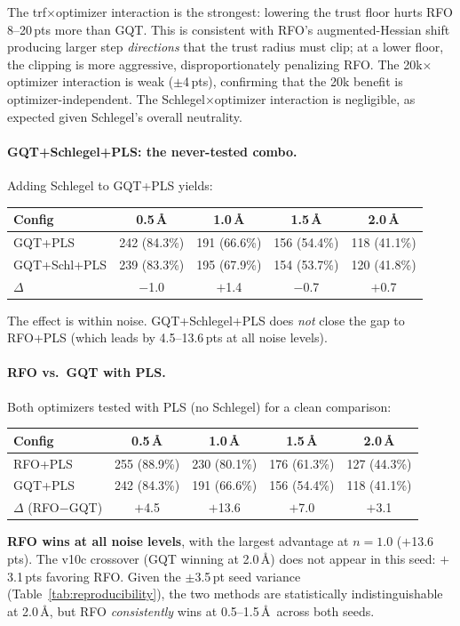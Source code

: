 \documentclass[11pt,a4paper]{article}
\theoremstyle{definition}
\begin{document}
The trf$\times$optimizer interaction is the strongest: lowering the trust
floor hurts RFO 8--20\,pts more than GQT.  This is consistent with RFO's
augmented-Hessian shift producing larger step \emph{directions} that the
trust radius must clip; at a lower floor, the clipping is more aggressive,
disproportionately penalizing RFO.  The 20k$\times$optimizer interaction
is weak ($\pm$4\,pts), confirming that the 20k benefit is optimizer-independent.
The Schlegel$\times$optimizer interaction is negligible, as expected given
Schlegel's overall neutrality.

\paragraph{GQT+Schlegel+PLS: the never-tested combo.}
Adding Schlegel to GQT+PLS yields:
\begin{center}
\begin{tabular}{lcccc}
\toprule
Config & 0.5\,\AA & 1.0\,\AA & 1.5\,\AA & 2.0\,\AA \\
\midrule
GQT+PLS       & 242 (84.3\%) & 191 (66.6\%) & 156 (54.4\%) & 118 (41.1\%) \\
GQT+Schl+PLS  & 239 (83.3\%) & 195 (67.9\%) & 154 (53.7\%) & 120 (41.8\%) \\
$\Delta$       & $-$1.0       & $+$1.4       & $-$0.7       & $+$0.7       \\
\bottomrule
\end{tabular}
\end{center}
The effect is within noise.  GQT+Schlegel+PLS does \emph{not} close the gap
to RFO+PLS (which leads by 4.5--13.6\,pts at all noise levels).

\paragraph{RFO vs.\ GQT with PLS.}
Both optimizers tested with PLS (no Schlegel) for a clean comparison:
\begin{center}
\begin{tabular}{lcccc}
\toprule
Config & 0.5\,\AA & 1.0\,\AA & 1.5\,\AA & 2.0\,\AA \\
\midrule
RFO+PLS  & 255 (88.9\%) & 230 (80.1\%) & 176 (61.3\%) & 127 (44.3\%) \\
GQT+PLS  & 242 (84.3\%) & 191 (66.6\%) & 156 (54.4\%) & 118 (41.1\%) \\
$\Delta$ (RFO$-$GQT) & $+$4.5 & $+$13.6 & $+$7.0 & $+$3.1 \\
\bottomrule
\end{tabular}
\end{center}
\textbf{RFO wins at all noise levels}, with the largest advantage at
$n=1.0$ ($+$13.6\,pts).  The v10c crossover (GQT winning at 2.0\,\AA)
does not appear in this seed: $+$3.1\,pts favoring RFO.  Given the
$\pm$3.5\,pt seed variance (Table~\ref{tab:reproducibility}), the two
methods are statistically indistinguishable at 2.0\,\AA, but RFO
\emph{consistently} wins at 0.5--1.5\,\AA\ across both seeds.
\end{document}
